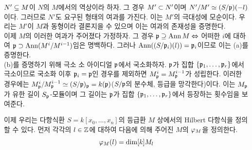 \begin{proposition}
{		$N'\subseteq M$이 $N$의 $M$에서의 역상이라 하자. 그 경우 $M'\subset N'$이며 $N'/M'\simeq(S/\mathfrak{p})(-l)$이다.
		그러므로 $N'$도 요구된 형태의 여과를 가진다. 이는 $M'$의 극대성에 모순이다.
		우리는 $M'$이 $M$과 동형이라 결론지을 수 있으며 이는 여과의 존재성을 증명한다.\\
		이제 $M$의 이러한 여과가 주어졌다 가정하자.
		그 경우 $\mathfrak{p}\supseteq\operatorname{Ann} M\Leftrightarrow$ 어떠한 $i$에 대하여 $\mathfrak{p}\supset\operatorname{Ann}(M^i/M^{i-1})$임은 명백하다.
		그러나 $\operatorname{Ann}((S/\mathfrak{p}_i)(l))=\mathfrak{p}_i$이므로 이는 (a)를 증명한다.\\
		(b)를 증명하기 위해 극소 소 아이디얼 $\mathfrak{p}$에서 국소화하자. $\mathfrak{p}$가 집합 $\{\mathfrak{p}_1,\ldots,\mathfrak{p}_r\}$에서 극소이므로
		국소화 이후 $\mathfrak{p}_i=\mathfrak{p}$인 경우를 제외하면 $M^i_{\mathfrak{p}}=M^{i-1}_{\mathfrak{p}}$가 성립한다.
		이러한 경우에는 $M^i_{\mathfrak{p}}/M^{i-1}_{\mathfrak{p}}\simeq(S/\mathfrak{p})_{\mathfrak{p}}=k(\mathfrak{p})$($S/\mathfrak{p}$의 분수체, 등급을 망각한다)이다.
		이는 $M_{\mathfrak{p}}$가 유한 길이 $S_{\mathfrak{p}}$-모듈이며
		그 길이는 $\mathfrak{p}$가 집합 $\{\mathfrak{p}_1,\ldots,\mathfrak{p}_r\}$에서 등장하는 횟수임을 보여준다.}
	\end{proposition}
	
	
	\begin{definition}
	\end{definition}
	
	이제 우리는 다항식환 $S=k[x_0,\ldots,x_n]$의 등급환 $M$ 상에서의 Hilbert 다항식을 정의할 수 있다.
	먼저 각각의 $l\in\mathbb Z$에 대하여 다음에 의해 주어진 $M$의  $\varphi_M$을 정의한다.
	$$\varphi_M(l)=\dim[k]M_l$$
	
